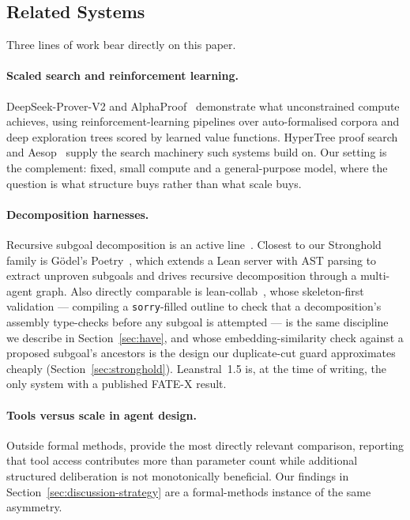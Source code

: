 \documentclass[12pt, a4paper]{article}
\begin{document}
\subsection{Related Systems}
\label{sec:related}

Three lines of work bear directly on this paper.

\paragraph{Scaled search and reinforcement learning.} DeepSeek-Prover-V2
\cite{deepseekproverv2} and AlphaProof~\cite{alphaproof2024} demonstrate
what unconstrained compute achieves, using reinforcement-learning pipelines
over auto-formalised corpora and deep exploration trees scored by learned
value functions. HyperTree proof search~\cite{lample2022hypertree} and
Aesop~\cite{limperg2023aesop} supply the search machinery such systems build
on. Our setting is the complement: fixed, small compute and a general-purpose
model, where the question is what structure buys rather than what scale buys.

\paragraph{Decomposition harnesses.} Recursive subgoal decomposition is an
active line~\cite{decomposition_openreview}. Closest to our Stronghold family
is Gödel's Poetry~\cite{davis2025goedelspoetry}, which extends a Lean server
with AST parsing to extract unproven subgoals and drives recursive
decomposition through a multi-agent graph. Also directly comparable is
lean-collab~\cite{leancollab2026}, whose skeleton-first validation --- compiling
a \texttt{sorry}-filled outline to check that a decomposition's assembly
type-checks before any subgoal is attempted --- is the same discipline we
describe in Section~\ref{sec:have}, and whose embedding-similarity check
against a proposed subgoal's ancestors is the design our duplicate-cut guard
approximates cheaply (Section~\ref{sec:stronghold}). Leanstral~1.5
\cite{leanstral2026} is, at the time of writing, the only system with a
published FATE-X result.

\paragraph{Tools versus scale in agent design.} Outside formal methods,
\textcite{zywot2025smallagents} provide the most directly relevant
comparison, reporting that tool access contributes more than parameter
count while additional structured deliberation is not monotonically
beneficial. Our findings in Section~\ref{sec:discussion-strategy} are a
formal-methods instance of the same asymmetry.
\end{document}
